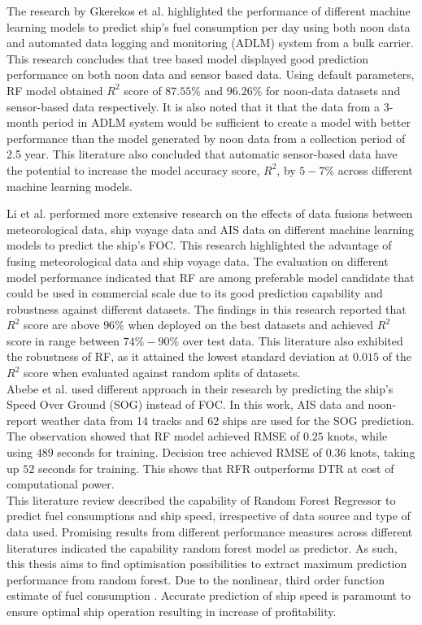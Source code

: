 The research by Gkerekos et al. \cite{Gkerekos.2019} highlighted the performance of different machine learning models to predict ship's fuel consumption per day using both noon data and automated data logging and monitoring (ADLM) system from a bulk carrier. This research concludes that tree based model displayed good prediction performance on both noon data and sensor based data. Using default parameters, RF model obtained $R^2$ score of $87.55\%$ and $96.26\%$ for noon-data datasets and sensor-based data respectively. It is also noted that it that the data from a 3-month period in ADLM system would be sufficient to create a model with better performance than the model generated by noon data from a collection period of 2.5 year. This literature also concluded that automatic sensor-based data have the potential to increase the model accuracy score, $R^2$, by $5-7\%$ across different machine learning models.\\
\newpage

Li et al. \cite{Li.2022} performed more extensive research on the effects of data fusions between meteorological data, ship voyage data and AIS data on different machine learning models to predict the ship's FOC. This research highlighted the advantage of fusing meteorological data and ship voyage data. The evaluation on different model performance indicated that RF are among preferable model candidate that could be used in commercial scale due to its good prediction capability and robustness against different datasets. The findings in this research reported that $R^2$ score are above $96\%$ when deployed on the best datasets and achieved $R^2$ score in range between $74\% - 90\%$ over test data. This literature also exhibited the robustness of RF, as it attained the lowest standard deviation at $0.015$ of the $R^2$ score when evaluated against random splits of datasets.\\

Abebe et al. \cite{Abebe.2020} used different approach in their research by predicting the ship's Speed Over Ground (SOG) instead of FOC. In this work, AIS data and noon-report weather data from 14 tracks and 62 ships are used for the SOG prediction. The observation showed that RF model achieved RMSE of $0.25$ knots, while using $489$ seconds for training. Decision tree achieved RMSE of $0.36$ knots, taking up $52$ seconds for training. This shows that RFR outperforms DTR at cost of computational power.\\

This literature review described the capability of Random Forest Regressor to predict fuel consumptions and ship speed, irrespective of data source and type of data used. Promising results from different performance measures across different literatures indicated the capability random forest model as predictor. As such, this thesis aims to find optimisation possibilities to extract maximum prediction performance from random forest. Due to the nonlinear, third order function estimate of fuel consumption \cite{Ronen.1982,Ronen.2011}. Accurate prediction of ship speed is paramount to ensure optimal ship operation resulting in increase of profitability. 

